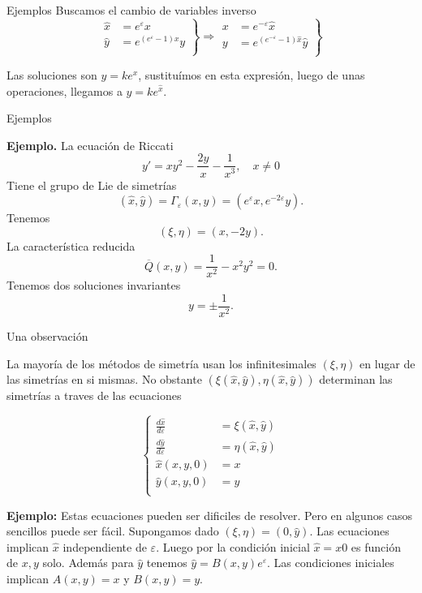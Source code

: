 \documentclass[handout,hyperref={colorlinks=true}]{beamer}
\renewcommand{\epsilon}{\varepsilon}
\newcommand{\nl}{\onslide<+-> }
\begin{document}
\begin{frame}{Ejemplos}
Buscamos el cambio de variables inverso
\[
\left.
\begin{array}{ll} 
  \hat{x}&= e^{\epsilon}x\\
  \hat{y}&=e^{(e^{\epsilon}-1)x}y\\
\end{array}
\right\} 
\Rightarrow  
    \left.
\begin{array}{ll} 
  x&= e^{-\epsilon}\hat{x}\\
  y&=e^{(e^{-\epsilon}-1)\hat{x}}\hat{y}\\
\end{array}
\right\} 
\]    

Las soluciones son $y=ke^x$, sustituímos en esta expresión, luego de unas operaciones, llegamos a $\hat{y}=ke^{\hat{x}}$.
\end{frame}



\begin{frame}{Ejemplos}

\textbf{Ejemplo.} La ecuación de Riccati
\[y'=xy^2-\frac{2y}{x}-\frac{1}{x^3},\quad x\neq 0\] 
 Tiene el grupo de Lie de simetrías
\[(\hat{x},\hat{y})=\Gamma_{\epsilon}(x,y)=(e^{\epsilon}x,e^{-2\epsilon}y).\]
Tenemos
\[(\xi,\eta)=(x,-2y).\]
La característica reducida
\[\overline{Q}(x,y)=\frac{1}{x^2}-x^2y^2=0.\]
Tenemos dos soluciones invariantes
\[y=\pm\frac{1}{x^2}.\] 


\end{frame}

\begin{frame}{Una observación}

\nl La mayoría de los métodos de simetría usan los infinitesimales $(\xi,\eta)$ en lugar de las simetrías en si mismas.  
No obstante  $(\xi(\hat{x},\hat{y}),\eta(\hat{x},\hat{y}))$ determinan las simetrías a traves de las ecuaciones

\[
\left\{
\begin{array}{ll}
\frac{d\hat{x}}{d\epsilon}&=\xi(\hat{x},\hat{y})\\
\frac{d\hat{y}}{d\epsilon}&=\eta(\hat{x},\hat{y})\\
\hat{x}(x,y,0)&=x\\
\hat{y}(x,y,0)&=y\\
\end{array}
\right.
\] 

\nl \textbf{Ejemplo:} Estas ecuaciones pueden ser dificiles de resolver. Pero en algunos casos sencillos puede ser fácil. Supongamos dado  $(\xi,\eta)=(0,\hat{y})$. Las ecuaciones implican $\hat{x}$ independiente de $\epsilon$.  Luego por la condición inicial $\hat{x}=x0$
 es función de $x,y$ solo. Además para $\hat{y}$ tenemos $\hat{y}=B(x,y)e^{\epsilon}$. Las condiciones iniciales implican $A(x,y)=x$ y $B(x,y)=y$.  

\end{frame}
\end{document}
